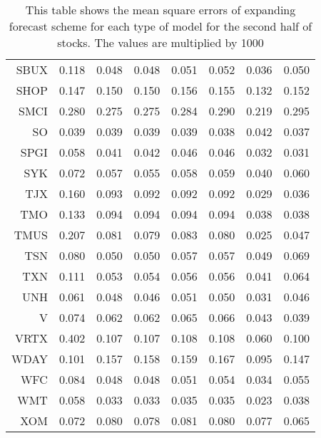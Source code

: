 \begin{table}[ht]
\begin{tabular}{rrrrrrrr}
  SBUX & 0.118 & 0.048 & 0.048 & 0.051 & 0.052 & 0.036 & 0.050 \\ 
  SHOP & 0.147 & 0.150 & 0.150 & 0.156 & 0.155 & 0.132 & 0.152 \\ 
  SMCI & 0.280 & 0.275 & 0.275 & 0.284 & 0.290 & 0.219 & 0.295 \\ 
  SO & 0.039 & 0.039 & 0.039 & 0.039 & 0.038 & 0.042 & 0.037 \\ 
  SPGI & 0.058 & 0.041 & 0.042 & 0.046 & 0.046 & 0.032 & 0.031 \\ 
  SYK & 0.072 & 0.057 & 0.055 & 0.058 & 0.059 & 0.040 & 0.060 \\ 
  TJX & 0.160 & 0.093 & 0.092 & 0.092 & 0.092 & 0.029 & 0.036 \\ 
  TMO & 0.133 & 0.094 & 0.094 & 0.094 & 0.094 & 0.038 & 0.038 \\ 
  TMUS & 0.207 & 0.081 & 0.079 & 0.083 & 0.080 & 0.025 & 0.047 \\ 
  TSN & 0.080 & 0.050 & 0.050 & 0.057 & 0.057 & 0.049 & 0.069 \\ 
  TXN & 0.111 & 0.053 & 0.054 & 0.056 & 0.056 & 0.041 & 0.064 \\ 
  UNH & 0.061 & 0.048 & 0.046 & 0.051 & 0.050 & 0.031 & 0.046 \\ 
  V & 0.074 & 0.062 & 0.062 & 0.065 & 0.066 & 0.043 & 0.039 \\ 
  VRTX & 0.402 & 0.107 & 0.107 & 0.108 & 0.108 & 0.060 & 0.100 \\ 
  WDAY & 0.101 & 0.157 & 0.158 & 0.159 & 0.167 & 0.095 & 0.147 \\ 
  WFC & 0.084 & 0.048 & 0.048 & 0.051 & 0.054 & 0.034 & 0.055 \\ 
  WMT & 0.058 & 0.033 & 0.033 & 0.035 & 0.035 & 0.023 & 0.038 \\ 
  XOM & 0.072 & 0.080 & 0.078 & 0.081 & 0.080 & 0.077 & 0.065 \\ 
   \hline
\end{tabular}
\caption[MSE expanding forecast (2)]{This table shows the mean square errors of expanding forecast scheme for each type of model for the second half of stocks. 
                     The values are multiplied by 1000} 
\label{Table:MSE_e_2}
\end{table}
